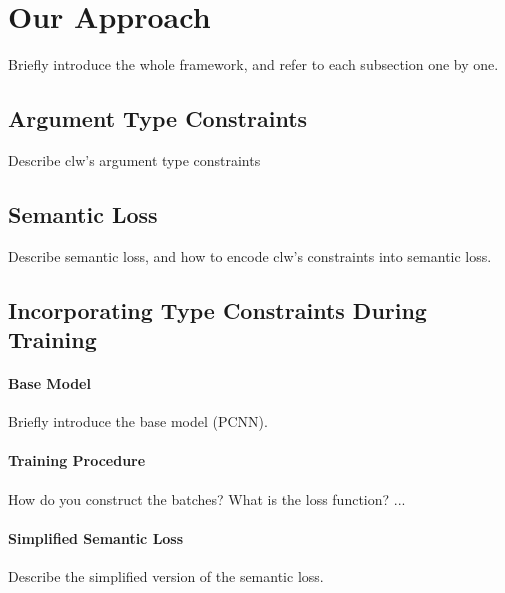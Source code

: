 \section{Our Approach}
Briefly introduce the whole framework, and refer to each subsection one by one.

\subsection{Argument Type Constraints}
Describe clw's argument type constraints

\subsection{Semantic Loss}
Describe semantic loss, and how to encode clw's constraints into semantic loss.

\subsection{Incorporating  Type Constraints During Training}

\paragraph{Base Model}
Briefly introduce the base model (PCNN).

\paragraph{Training Procedure}
How do you construct the batches?
What is the loss function?
...

\paragraph{Simplified Semantic Loss}
Describe the simplified version of the semantic loss.


